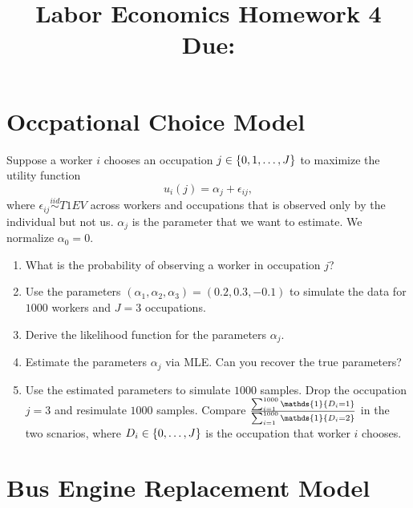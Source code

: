 \documentclass[12pt]{article}
\title{
    Labor Economics Homework 4 \\
    \large Due: \\
    }
\author{}
\date{}
\begin{document}
    

\maketitle
\vspace{-2cm}

\section{Occpational Choice Model}
Suppose a worker $i$ chooses an occupation $j\in\left\{ {0,1,\ldots,J} \right\}$ 
to maximize the utility function 
\begin{equation*}
    u_i(j) = \alpha_j + \epsilon_{ij},
\end{equation*}
where $\epsilon_{ij}\overset{iid}{\sim}T1EV$ across workers and occupations 
that is observed only by the individual but not us. $\alpha_j$ is the 
parameter that we want to estimate. We normalize $\alpha_0 = 0$.
\begin{enumerate}
    \item What is the probability of observing a worker in occupation $j$?
    \item Use the parameters $(\alpha_1, \alpha_2, \alpha_3) = (0.2, 0.3, -0.1)$ 
    to simulate the data for $1000$ workers and $J=3$ occupations.
    \item Derive the likelihood function for the parameters $\alpha_j$.
    \item Estimate the parameters $\alpha_j$ via MLE. Can you recover the true 
    parameters?
    \item Use the estimated parameters to simulate $1000$ samples. 
    Drop the occupation $j=3$ and resimulate $1000$ samples. Compare  
    $\frac{\sum_{i=1}^{1000}\mathds{1}\brc{D_i=1}}{\sum_{i=1}^{1000}\mathds{1}\brc{D_i=2}}$ 
    in the two scnarios, where $D_i\in \left\{ {0,\ldots,J} \right\}$ is the occupation 
    that worker $i$ chooses.
\end{enumerate}

\section{Bus Engine Replacement Model}
\end{document}
